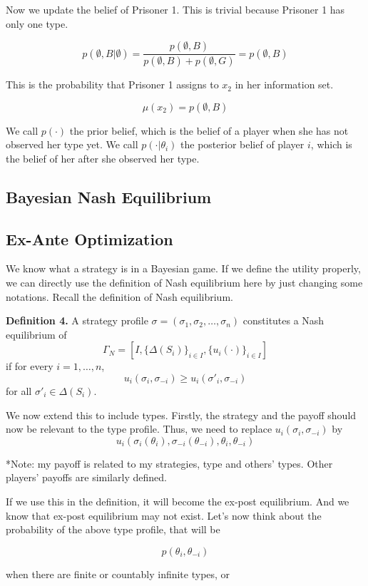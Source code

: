\documentclass[12pt, oneside]{article}
\begin{document}
Now we update the belief of Prisoner 1. This is trivial because Prisoner 1 has only one type.

\[
p(\emptyset, B | \emptyset) = \frac{p(\emptyset, B)}{p(\emptyset, B) + p(\emptyset, G)} = p(\emptyset, B)
\]

This is the probability that Prisoner 1 assigns to \( x_2 \) in her information set.

\[
\mu(x_2) = p(\emptyset, B)
\]

We call \( p(\cdot) \) the prior belief, which is the belief of a player when she has not observed her type yet. We call \( p(\cdot | \theta_i) \) the posterior belief of player \( i \), which is the belief of her after she observed her type.

\subsection{Bayesian Nash Equilibrium}
\subsection{Ex-Ante Optimization}
We know what a strategy is in a Bayesian game. If we define the utility properly, we can directly use the definition of Nash equilibrium here by just changing some notations. Recall the definition of Nash equilibrium.

\textbf{Definition 4.} A strategy profile \( \sigma = (\sigma_1, \sigma_2, \dots, \sigma_n) \) constitutes a Nash equilibrium of 
\[
\Gamma_N = [I, \{\Delta(S_i)\}_{i\in I}, \{u_i(\cdot)\}_{i\in I}]
\]
if for every \( i = 1, \dots, n \),
\[
u_i(\sigma_i, \sigma_{-i}) \geq u_i(\sigma'_i, \sigma_{-i})
\]
for all \( \sigma'_i \in \Delta(S_i) \).

We now extend this to include types. Firstly, the strategy and the payoff should now be relevant to the type profile. Thus, we need to replace \( u_i(\sigma_i, \sigma_{-i}) \) by
\[
u_i(\sigma_i(\theta_i), \sigma_{-i}(\theta_{-i}), \theta_i, \theta_{-i})
\]

*Note: my payoff is related to my strategies, type and others’ types. Other players’ payoffs are similarly defined.

If we use this in the definition, it will become the ex-post equilibrium. And we know that ex-post equilibrium may not exist. Let's now think about the probability of the above type profile, that will be

\[
p(\theta_i, \theta_{-i})
\]

when there are finite or countably infinite types, or
\end{document}
